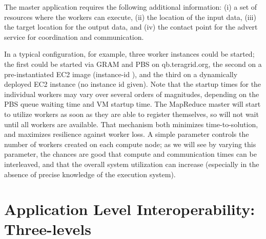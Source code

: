 \documentclass[3p,twocolumn]{elsarticle}
\begin{document}
The master application requires the following additional information:
(i) a set of resources where the workers can execute, (ii) the
location of the input data, (iii) the target location for the output
data, and (iv) the contact point for the advert service for
coordination and communication.  

In a typical configuration, for example, three worker instances could
be started; the first could be started via GRAM and PBS on
qb.teragrid.org, the second on a pre-instantiated EC2 image
(instance-id ), and the third on a dynamically deployed
EC2 instance (no instance id given).  Note that the startup times for
the individual workers may vary over several orders of magnitudes,
depending on the PBS queue waiting time and VM startup time.  The
MapReduce master will start to utilize workers as soon as they are
able to register themselves, so will not wait until all workers are
available.  That mechanism both minimizes time-to-solution, and
maximizes resilience against worker loss.
%
%
A simple parameter controls the number of workers created on each
compute node; as we will see by varying this parameter, the chances
are good that compute and communication times can be interleaved, and
that the overall system utilization can increase (especially in the
absence of precise knowledge of the execution system).
 

\section{Application Level Interoperability: Three-levels}
\label{sec:interop}
\end{document}
